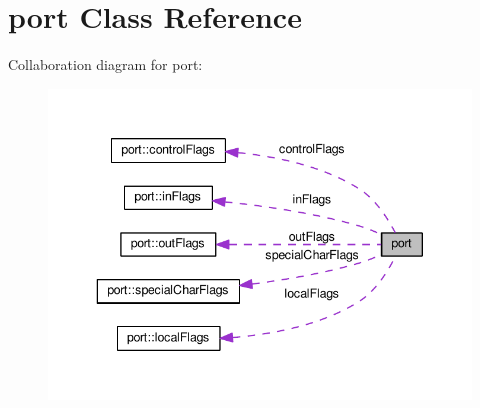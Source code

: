\hypertarget{classport}{}\section{port Class Reference}
\label{classport}


Collaboration diagram for port\+:\nopagebreak
\begin{figure}[H]
\begin{center}
\leavevmode
\includegraphics[width=343pt]{classport__coll__graph}
\end{center}
\end{figure}
